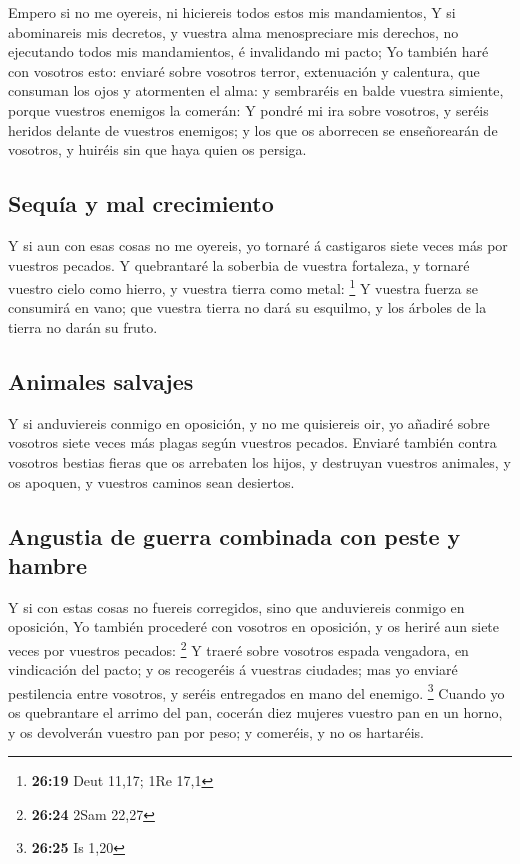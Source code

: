  Empero si no me oyereis, ni hiciereis todos estos mis
mandamientos,  Y si abominareis mis decretos, y vuestra
alma menospreciare mis derechos, no ejecutando todos mis mandamientos, é
invalidando mi pacto;  Yo también haré con vosotros esto:
enviaré sobre vosotros terror, extenuación y calentura, que consuman los
ojos y atormenten el alma: y sembraréis en balde vuestra simiente,
porque vuestros enemigos la comerán:  Y pondré mi ira
sobre vosotros, y seréis heridos delante de vuestros enemigos; y los que
os aborrecen se enseñorearán de vosotros, y huiréis sin que haya quien
os persiga.

\hypertarget{sequuxeda-y-mal-crecimiento}{%
\subsection{Sequía y mal
crecimiento}\label{sequuxeda-y-mal-crecimiento}}

 Y si aun con esas cosas no me oyereis, yo tornaré á
castigaros siete veces más por vuestros pecados.  Y
quebrantaré la soberbia de vuestra fortaleza, y tornaré vuestro cielo
como hierro, y vuestra tierra como metal: \footnote{\textbf{26:19} Deut
  11,17; 1Re 17,1}  Y vuestra fuerza se consumirá en
vano; que vuestra tierra no dará su esquilmo, y los árboles de la tierra
no darán su fruto.

\hypertarget{animales-salvajes}{%
\subsection{Animales salvajes}\label{animales-salvajes}}

 Y si anduviereis conmigo en oposición, y no me
quisiereis oir, yo añadiré sobre vosotros siete veces más plagas según
vuestros pecados.  Enviaré también contra vosotros
bestias fieras que os arrebaten los hijos, y destruyan vuestros
animales, y os apoquen, y vuestros caminos sean desiertos.

\hypertarget{angustia-de-guerra-combinada-con-peste-y-hambre}{%
\subsection{Angustia de guerra combinada con peste y
hambre}\label{angustia-de-guerra-combinada-con-peste-y-hambre}}

 Y si con estas cosas no fuereis corregidos, sino que
anduviereis conmigo en oposición,  Yo también procederé
con vosotros en oposición, y os heriré aun siete veces por vuestros
pecados: \footnote{\textbf{26:24} 2Sam 22,27}  Y traeré
sobre vosotros espada vengadora, en vindicación del pacto; y os
recogeréis á vuestras ciudades; mas yo enviaré pestilencia entre
vosotros, y seréis entregados en mano del enemigo. \footnote{\textbf{26:25}
  Is 1,20}  Cuando yo os quebrantare el arrimo del pan,
cocerán diez mujeres vuestro pan en un horno, y os devolverán vuestro
pan por peso; y comeréis, y no os hartaréis.

